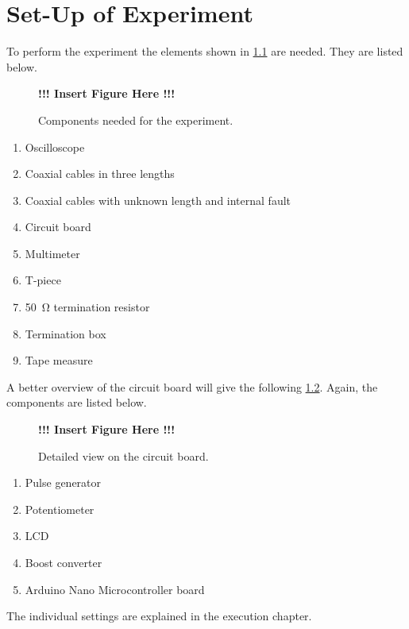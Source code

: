 \chapter{Set-Up of Experiment}
    To perform the experiment the elements shown in \cref{fig:setup} are needed. They are listed below.
    \begin{figure}[H]
        \centering
        \begin{framed}
            \textbf{!!! Insert Figure Here !!!}
        \end{framed}
        \caption{Components needed for the experiment.}  
        \label{fig:setup}
    \end{figure}
    \begin{enumerate}
        \item Oscilloscope
        \item Coaxial cables in three lengths
        \item Coaxial cables with unknown length and internal fault
        \item Circuit board
        \item Multimeter
        \item T-piece
        \item \SI{50}{\ohm} termination resistor
        \item Termination box
        \item Tape measure
    \end{enumerate}
    A better overview of the circuit board will give the following \cref{fig:circuit_board}. Again, the components are listed
    below.
    \begin{figure}[H]
        \centering
        \begin{framed}
            \textbf{!!! Insert Figure Here !!!}
        \end{framed}
        \caption{Detailed view on the circuit board.}  
        \label{fig:circuit_board}
    \end{figure}
    \begin{enumerate}
        \item Pulse generator
        \item Potentiometer
        \item LCD
        \item Boost converter
        \item Arduino Nano Microcontroller board
    \end{enumerate}
    The individual settings are explained in the execution chapter.